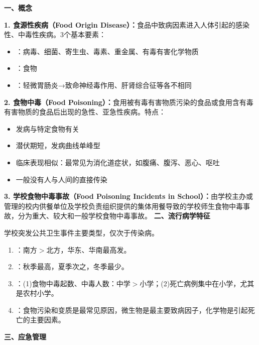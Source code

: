 \begin{keybox}
\textbf{一、概念}

\textbf{1. 食源性疾病（Food Origin Disease）：}食品中致病因素进入人体引起的感染性、中毒性疾病。3个基本要素：
\begin{itemize}[leftmargin=*]
    \item {}：病毒、细菌、寄生虫、毒素、重金属、有毒有害化学物质
    \item {}：食物
    \item {}：轻微胃肠炎→致命神经毒作用、肝肾综合征等各不相同
\end{itemize}

\textbf{2. 食物中毒（Food Poisoning）：}食用被有毒有害物质污染的食品或食用含有毒有害物质的食品后出现的急性、亚急性疾病。特点：
\begin{itemize}[leftmargin=*]
    \item 发病与特定食物有关
    \item 潜伏期短，发病曲线单峰型
    \item 临床表现相似：最常见为消化道症状，如腹痛、腹泻、恶心、呕吐
    \item 一般没有人与人间的直接传染
\end{itemize}

\textbf{3. 学校食物中毒事故（Food Poisoning Incidents in School）：}由学校主办或管理的校内供餐单位及学校负责组织提供的集体用餐导致的学校师生食物中毒事故，分为重大、较大和一般学校食物中毒事故。
\textbf{二、流行病学特征}

学校突发公共卫生事件主要类型，仅次于传染病。

\begin{enumerate}[leftmargin=*]
    \item {}：南方$>$北方，华东、华南最高发。
    \item {}：秋季最高，夏季次之，冬季最少。
    \item {}：(1)食物中毒起数、中毒人数：中学$>$小学；(2)死亡病例集中在小学，尤其是农村小学。
    \item {}：食物污染和变质是最常见原因，微生物是最主要致病因子，化学物是引起死亡的主要因素。
\end{enumerate}
\textbf{三、应急管理}


\end{keybox}
